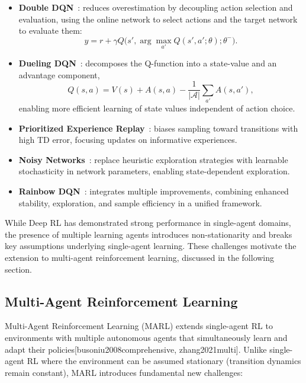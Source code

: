 \begin{itemize}
    \item \textbf{Double DQN}~\cite{van2016deep}: reduces overestimation by decoupling action selection and evaluation, using the online network to select actions and the target network to evaluate them:
    \begin{equation}
    y = r + \gamma Q\big(s', \arg\max_{a'} Q(s',a';\theta);\theta^{-}\big).
    \label{eq:double_dqn_target}
    \end{equation}

    \item \textbf{Dueling DQN}~\cite{wang2016dueling}: decomposes the Q-function into a state-value and an advantage component,
    \begin{equation}
    Q(s,a) = V(s) + A(s,a) - \frac{1}{|\mathcal{A}|} \sum_{a'} A(s,a'),
    \label{eq:dueling_dqn}
    \end{equation}
    enabling more efficient learning of state values independent of action choice.

    \item \textbf{Prioritized Experience Replay}~\cite{schaul2015prioritized}: biases sampling toward transitions with high TD error, focusing updates on informative experiences.

    \item \textbf{Noisy Networks}~\cite{fortunato2017noisy}: replace heuristic exploration strategies with learnable stochasticity in network parameters, enabling state-dependent exploration.

    \item \textbf{Rainbow DQN}~\cite{hessel2018rainbow}: integrates multiple improvements, combining enhanced stability, exploration, and sample efficiency in a unified framework.
\end{itemize}

While Deep RL has demonstrated strong performance in single-agent domains, the presence of multiple learning agents introduces non-stationarity and breaks key assumptions underlying single-agent learning. These challenges motivate the extension to multi-agent reinforcement learning, discussed in the following section.


\subsection{Multi-Agent Reinforcement Learning}
\label{sec:marl_intro}

Multi-Agent Reinforcement Learning (MARL) extends single-agent RL to environments with multiple autonomous agents that simultaneously learn and adapt their policies[busoniu2008comprehensive, zhang2021multi]. Unlike single-agent RL where the environment can be assumed stationary (transition dynamics remain constant), MARL introduces fundamental new challenges:

